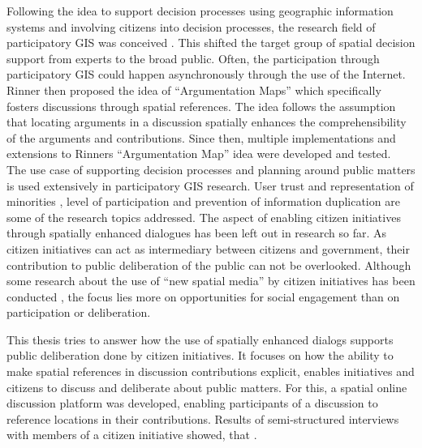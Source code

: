 Following the idea to support decision processes using geographic information systems and involving citizens into decision processes, the research field of participatory GIS was conceived \cite{Macintosh2004_eParticipation_characterization,Sieber2006_PublicParticipationGIS}. This shifted the target group of spatial decision support from experts to the broad public. Often, the participation through participatory GIS could happen asynchronously through the use of the Internet. Rinner then proposed the idea of ``Argumentation Maps'' \cite{Rinner_ArgumentationMaps} which specifically fosters discussions through spatial references. The idea follows the assumption that locating arguments in a discussion spatially enhances the comprehensibility of the arguments and contributions. Since then, multiple implementations and extensions to Rinners ``Argumentation Map'' idea were developed and tested.\\
The use case of supporting decision processes and planning around public matters is used extensively in participatory GIS research. User trust and representation of minorities \cite{Carver2001_PPGIS_Cyberdemocracy}, level of participation \cite{Steinmann2005_Combination_Ladder_GIS} and prevention of information duplication \cite{Hopfer2007_Communication} are some of the research topics addressed. The aspect of enabling citizen initiatives through spatially enhanced dialogues has been left out in research so far. As citizen initiatives can act as intermediary between citizens and government, their contribution to public deliberation of the public can not be overlooked. Although some research about the use of ``new spatial media'' by citizen initiatives has been conducted \cite{Elwood2013_NewSpatialMedia}, the focus lies more on opportunities for social engagement than on participation or deliberation.

This thesis tries to answer how the use of spatially enhanced dialogs supports public deliberation done by citizen initiatives. It focuses on how the ability to make spatial references in discussion contributions explicit, enables initiatives and citizens to discuss and deliberate about public matters. For this, a spatial online discussion platform was developed, enabling participants of a discussion to reference locations in their contributions. Results of semi-structured interviews with members of a citizen initiative showed, that .


